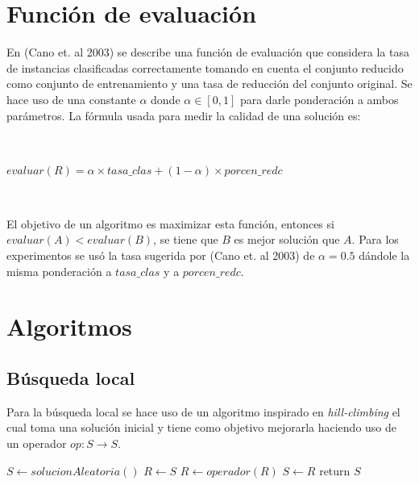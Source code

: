 \documentclass[11pt]{article}
\begin{document}
\section{Función de evaluación}
En (Cano et. al 2003) se describe una función de evaluación que considera la tasa de instancias clasificadas correctamente tomando en cuenta el conjunto reducido como conjunto de entrenamiento y una tasa de reducción del conjunto original. Se hace uso de una constante $\alpha$ donde $\alpha \in [0,1]$ para darle ponderación a ambos parámetros. La fórmula usada para medir la calidad de una solución es:

~\

\begin{center}
    {\fontsize{10}{10}\selectfont
    $ evaluar(R) = \alpha \times tasa\_clas + (1 - \alpha) \times porcen\_redc $
    }
\end{center}

~\

El objetivo de un algoritmo es maximizar esta función, entonces si $evaluar(A) < evaluar(B)$, se tiene que $B$ es mejor solución que $A$. Para los experimentos se usó la tasa sugerida por (Cano et. al 2003) de $\alpha = 0.5$ dándole la misma ponderación a $tasa\_clas$ y a $porcen\_redc$.

\section{Algoritmos}

    \subsection{Búsqueda local}
    Para la búsqueda local se hace uso de un algoritmo inspirado en \emph{hill-climbing} el cual toma una solución inicial y tiene como objetivo mejorarla haciendo uso de un operador $op: S \to S$. \\

    {\fontsize{10}{10}\selectfont
    \begin{algorithmic}
            \State $S \gets solucionAleatoria()$
                \State $R \gets S$
                \State $R \gets operador(R)$
                    \State $S \gets R$
                \EndIf
            \EndWhile
            \State return $S$
        \EndFunction
    \end{algorithmic}
    }
\end{document}
